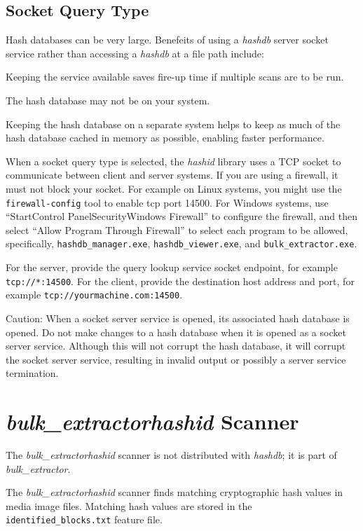 \documentclass[11pt,twoside]{article}
\newcommand \bulk {\textit{bulk\_extractor}\xspace}
\newcommand \hdb {\textit{hashdb}\xspace}
\newcommand \hid {\textit{hashid}\xspace}
\begin{document}
\subsection{Socket Query Type\label{socket-query-type}}
Hash databases can be very large.
Benefeits of using a \hdb server socket service
rather than accessing a \hdb at a file path include:
\begin{compactitem}	
\item Keeping the service available saves fire-up time
if multiple scans are to be run.
\item The hash database may not be on your system.
\item Keeping the hash database on a separate system helps to
keep as much of the hash database cached in memory as possible,
enabling faster performance.
\end{compactitem}	

When a socket query type is selected,
the \hid library uses a TCP socket to communicate
between client and server systems.
If you are using a firewall, it must not block your socket.
For example on Linux systems, you might use the \texttt{firewall-config}
tool to enable tcp port 14500.
For Windows systems,
use ``Start\textbar Control Panel\textbar Security\textbar Windows Firewall''
to configure the firewall, and then select ``Allow Program Through Firewall''
to select each program to be allowed,
specifically, \texttt{hashdb\_manager.exe},
\texttt{hashdb\_viewer.exe}, and \texttt{bulk\_extractor.exe}.

For the server, provide the query lookup service socket endpoint,
for example \texttt{tcp://*:14500}.
For the client, provide the destination host address and port,
for example \texttt{tcp://yourmachine.com:14500}.

Caution: When a socket server service is opened,
its associated hash database is opened.
Do not make changes to a hash database
when it is opened as a socket server service.
Although this will not corrupt the hash database,
it will corrupt the socket server service,
resulting in invalid output or possibly a server service termination.

\section{\bulk \hid Scanner\label{hid-scanner}}
The \bulk \hid scanner is not distributed with \hdb; it is part of \bulk.

The \bulk \hid scanner finds matching cryptographic hash values
in media image files.
Matching hash values are stored in the \texttt{identified\_blocks.txt}
feature file.
\end{document}
